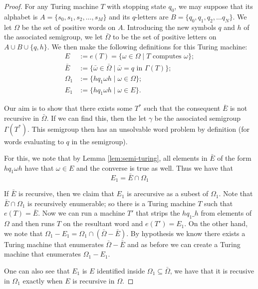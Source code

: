 \begin{proof}
  For any Turing machine $T$ with stopping state $q_0$, we may suppose that its alphabet is $A = \{s_0,s_1,s_2, \dots, s_M \}$ and its $q$-letters are $B = \{q_0,q_1,q_2, \dots q_N\}$. We let $\Omega$ be the set of positive words on $A$. Introducing the new symbols $q$ and $h$ of the associated semigroup, we let $\bar{\Omega}$ to be the set of positive letters on $A \cup B \cup \{ q,h \}$. We then make the following definitions for this Turing machine:
  \begin{align*}
    E &:= e(T) = \{\omega \in \Omega \mid T \text{ computes } \omega\}; \\
    \bar{E} &:= \{\bar{\omega} \in \bar{\Omega} \mid  \bar{\omega} = q \text{ in } \Gamma(T) \}; \\
    \Omega_1 &:= \{hq_1\omega h \mid \omega \in \Omega\}; \\
    E_1 &:= \{hq_1\omega h \mid \omega \in E \}.
  \end{align*}

  Our aim is to show that there exists some $T^*$ such that the consequent $\bar{E}$ is not recursive in $\bar{\Omega}$. If we can find this, then the let $\gamma$ be the associated semigroup $\Gamma(T^*)$. This semigroup then has an unsolvable word problem by definition (for words evaluating to $q$ in the semigroup).

  For this, we note that by Lemma \ref{lem:semi-turing}, all elements in $\bar{E}$ of the form $hq_1\omega h$ have that $\omega \in E$ and the converse is true as well. Thus we have that
  \begin{equation*}
    E_1 = \bar{E} \cap \Omega_1
  \end{equation*}

  If $\bar{E}$ is recursive, then we claim that $E_1$ is arecursive as a subest of $\Omega_1$. Note that $\bar{E} \cap \Omega_1$ is recursively enumerable; so there is a Turing machine $T$ such that $e(T) = \bar{E}$. Now we can run a machine $T'$ that strips the $hq_1 \_ h$ from elements of $\Omega$ and then runs $T$ on the resultant word and $e(T') = E_1$. On the other hand, we note that $\Omega_1 - E_1 = \Omega_1 \cap (\bar{\Omega} - \bar{E})$. By hypothesis we know there exists a Turing machine that enumerates $\bar{\Omega} - \bar{E}$ and as before we can create a Turing machine that enumerates $\Omega_1 - E_1$.
  
  One can also see that $E_1$ is $E$ identified inside $\Omega_1 \subseteq \bar{\Omega}$, we have that it is recusive in $\Omega_1$ exactly when $E$ is recursive in $\Omega$.


\end{proof}
